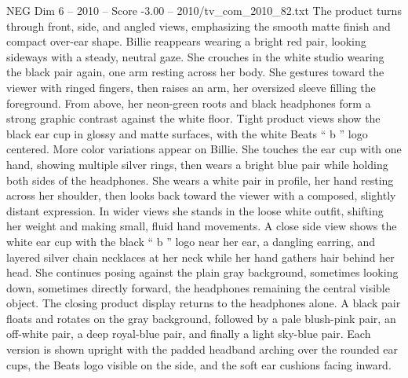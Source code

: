 \begin{textsample}{NEG Dim 6 – 2010 – Score -3.00 – 2010/tv\_com\_2010\_82.txt}
The product turns through front, side, and angled views, emphasizing the smooth matte finish and compact over-ear shape.
Billie reappears wearing a bright red pair, looking sideways with a steady, neutral gaze.
She crouches in the white studio wearing the black pair again, one arm resting across her body.
She gestures toward the viewer with ringed fingers, then raises an arm, her oversized sleeve filling the foreground.
From above, her neon-green roots and black headphones form a strong graphic contrast against the white floor.
Tight product views show the black ear cup in glossy and matte surfaces, with the white Beats “ b ” logo centered.
More color variations appear on Billie.
She touches the ear cup with one hand, showing multiple silver rings, then wears a bright blue pair while holding both sides of the headphones.
She wears a white pair in profile, her hand resting across her shoulder, then looks back toward the viewer with a composed, slightly distant expression.
In wider views she stands in the loose white outfit, shifting her weight and making small, fluid hand movements.
A close side view shows the white ear cup with the black “ b ” logo near her ear, a dangling earring, and layered silver chain necklaces at her neck while her hand gathers hair behind her head.
She continues posing against the plain gray background, sometimes looking down, sometimes directly forward, the headphones remaining the central visible object.
The closing product display returns to the headphones alone.
A black pair floats and rotates on the gray background, followed by a pale blush-pink pair, an off-white pair, a deep royal-blue pair, and finally a light sky-blue pair.
Each version is shown upright with the padded headband arching over the rounded ear cups, the Beats logo visible on the side, and the soft ear cushions facing inward.

\end{textsample}
